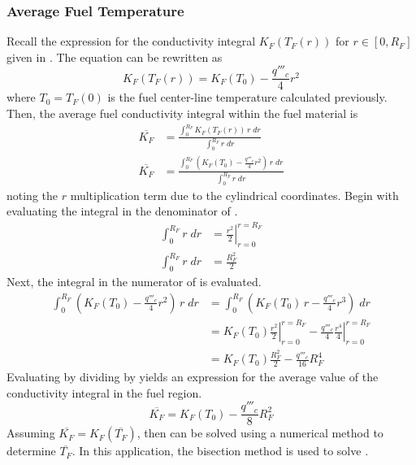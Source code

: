     \subsubsection{Average Fuel Temperature}
      Recall the expression for the conductivity integral $K_F(T_F(r))$ for $r
      \in [0,R_F]$ given in . The equation can be rewritten as
      \begin{equation}
        K_F(T_F(r)) = K_F(T_0) - \frac{q'''_c}{4} r^2
      \end{equation}
      where $T_0=T_F(0)$ is the fuel center-line temperature calculated 
      previously.
      Then, the average fuel conductivity integral within the fuel material is 
      \begin{align}
        \overline{K_F} &= \frac{\int_0^{R_F} K_F(T_F(r)) \, r \; dr}
          {\int_0^{R_F} r \; dr} \\
        \label{eq:kf_integral}
        \overline{K_F} &= \frac{\int_0^{R_F} 
          \left( K_F(T_0) - \frac{q'''_c}{4} r^2 \right)
          \, r \; dr}{\int_0^{R_F} r \; dr}
      \end{align}
      noting the $r$ multiplication term due to the cylindrical
      coordinates. Begin with evaluating the integral in the denominator
      of .
      \begin{align}
        \int_0^{R_F} r \; dr &= \left. \frac{r^2}{2} \right|_{r=0}^{r=R_F} \\
        \label{eq:kf_denominator}
        \int_0^{R_F} r \; dr &= \frac{R_F^2}{2}
      \end{align}
      Next, the integral in the numerator of  is evaluated.
      \begin{align}
        \int_0^{R_F} \left( K_F(T_0) - \frac{q'''_c}{4} r^2 \right) \, r \; dr&=
          \int_0^{R_F} \left( K_F(T_0) \, r - \frac{q'''_c}{4} r^3 \right) \;
          dr\\
        &= \left. K_F(T_0) \frac{r^2}{2} \right|_{r=0}^{r=R_F} -
          \left. \frac{q'''_c}{4} \frac{r^4}{4} \right|_{r=0}^{r=R_F} \\
        \label{eq:kf_numerator}
        &= K_F(T_0) \frac{R_F^2}{2} - \frac{q'''_c}{16} R_F^4
      \end{align}
      Evaluating  by dividing  by
       yields an expression for the average value of the
      conductivity integral in the fuel region.
      \begin{equation}
        \label{eq:kf_bar}
        \overline{K_F} = K_F(T_0) - \frac{q'''_c}{8} R_F^2
      \end{equation}
      Assuming $\overline{K_F} = K_F(\overline{T_F})$, then  can
      be solved using a numerical method to determine $\overline{T_F}$. In this
      application, the bisection method is used to solve .

